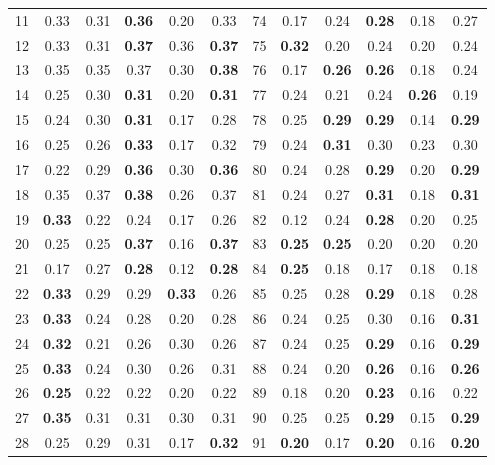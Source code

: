 \documentclass{article}
\begin{document}
{\begin{longtable}{cccccc@{\qquad}cccccc}
11 & 0.33 & 0.31 & \textbf{0.36} & 0.20 & 0.33 & 74 & 0.17 & 0.24 & \textbf{0.28} & 0.18 & 0.27 \\
12 & 0.33 & 0.31 & \textbf{0.37} & 0.36 & \textbf{0.37} & 75 & \textbf{0.32} & 0.20 & 0.24 & 0.20 & 0.24 \\
13 & 0.35 & 0.35 & 0.37 & 0.30 & \textbf{0.38} & 76 & 0.17 & \textbf{0.26} & \textbf{0.26} & 0.18 & 0.24 \\
14 & 0.25 & 0.30 & \textbf{0.31} & 0.20 & \textbf{0.31} & 77 & 0.24 & 0.21 & 0.24 & \textbf{0.26} & 0.19 \\
15 & 0.24 & 0.30 & \textbf{0.31} & 0.17 & 0.28 & 78 & 0.25 & \textbf{0.29} & \textbf{0.29} & 0.14 & \textbf{0.29} \\
16 & 0.25 & 0.26 & \textbf{0.33} & 0.17 & 0.32 & 79 & 0.24 & \textbf{0.31} & 0.30 & 0.23 & 0.30 \\
17 & 0.22 & 0.29 & \textbf{0.36} & 0.30 & \textbf{0.36} & 80 & 0.24 & 0.28 & \textbf{0.29} & 0.20 & \textbf{0.29} \\
18 & 0.35 & 0.37 & \textbf{0.38} & 0.26 & 0.37 & 81 & 0.24 & 0.27 & \textbf{0.31} & 0.18 & \textbf{0.31} \\
19 & \textbf{0.33} & 0.22 & 0.24 & 0.17 & 0.26 & 82 & 0.12 & 0.24 & \textbf{0.28} & 0.20 & 0.25 \\
20 & 0.25 & 0.25 & \textbf{0.37} & 0.16 & \textbf{0.37} & 83 & \textbf{0.25} & \textbf{0.25} & 0.20 & 0.20 & 0.20 \\
21 & 0.17 & 0.27 & \textbf{0.28} & 0.12 & \textbf{0.28} & 84 & \textbf{0.25} & 0.18 & 0.17 & 0.18 & 0.18 \\
22 & \textbf{0.33} & 0.29 & 0.29 & \textbf{0.33} & 0.26 & 85 & 0.25 & 0.28 & \textbf{0.29} & 0.18 & 0.28 \\
23 & \textbf{0.33} & 0.24 & 0.28 & 0.20 & 0.28 & 86 & 0.24 & 0.25 & 0.30 & 0.16 & \textbf{0.31} \\
24 & \textbf{0.32} & 0.21 & 0.26 & 0.30 & 0.26 & 87 & 0.24 & 0.25 & \textbf{0.29} & 0.16 & \textbf{0.29} \\
25 & \textbf{0.33} & 0.24 & 0.30 & 0.26 & 0.31 & 88 & 0.24 & 0.20 & \textbf{0.26} & 0.16 & \textbf{0.26} \\
26 & \textbf{0.25} & 0.22 & 0.22 & 0.20 & 0.22 & 89 & 0.18 & 0.20 & \textbf{0.23} & 0.16 & 0.22 \\
27 & \textbf{0.35} & 0.31 & 0.31 & 0.30 & 0.31 & 90 & 0.25 & 0.25 & \textbf{0.29} & 0.15 & \textbf{0.29} \\
28 & 0.25 & 0.29 & 0.31 & 0.17 & \textbf{0.32} & 91 & \textbf{0.20} & 0.17 & \textbf{0.20} & 0.16 & \textbf{0.20} \\

\end{longtable}}
\end{document}
